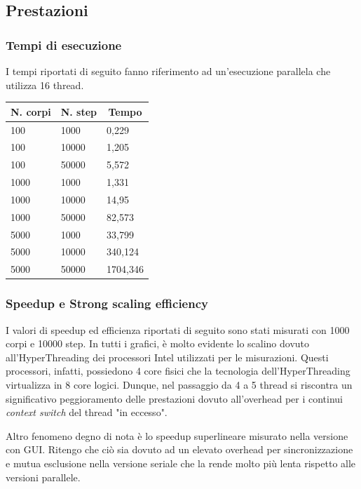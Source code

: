 \documentclass[12pt,a4paper,oneside]{article}
\begin{document}
	\subsection{Prestazioni}
	\subsubsection{Tempi di esecuzione}
	I tempi riportati di seguito fanno riferimento ad un'esecuzione parallela che utilizza 16 thread.
	\newline
	
	\begin{tabular}{|l|l|l|}
		\hline
		\multicolumn{1}{|c|}{\textbf{N. corpi}} & \multicolumn{1}{c|}{\textbf{N. step}} & \multicolumn{1}{c|}{\textbf{Tempo}} \\ \hline
		100 & 1000 & 0,229 \\ \hline
		100 & 10000 & 1,205 \\ \hline
		100 & 50000 & 5,572 \\ \hline
		1000 & 1000 & 1,331 \\ \hline
		1000 & 10000 & 14,95 \\ \hline
		1000 & 50000 & 82,573 \\ \hline
		5000 & 1000 & 33,799 \\ \hline
		5000 & 10000 & 340,124 \\ \hline
		5000 & 50000 & 1704,346 \\ \hline
	\end{tabular}

	\subsubsection{Speedup e Strong scaling efficiency}
	I valori di speedup ed efficienza riportati di seguito sono stati misurati con 1000 corpi e 10000 step. In tutti i grafici, è molto evidente lo scalino dovuto all'HyperThreading dei processori Intel utilizzati per le misurazioni. Questi processori, infatti, possiedono 4 core fisici che la tecnologia dell'HyperThreading virtualizza in 8 core logici. Dunque, nel passaggio da 4 a 5 thread si riscontra un significativo peggioramento delle prestazioni dovuto all'overhead per i continui \textit{context switch} del thread "in eccesso".
	
	Altro fenomeno degno di nota è lo speedup superlineare misurato nella versione con GUI. Ritengo che ciò sia dovuto ad un elevato overhead per sincronizzazione e mutua esclusione nella versione seriale che la rende molto più lenta rispetto alle versioni parallele.
	
\end{document}
